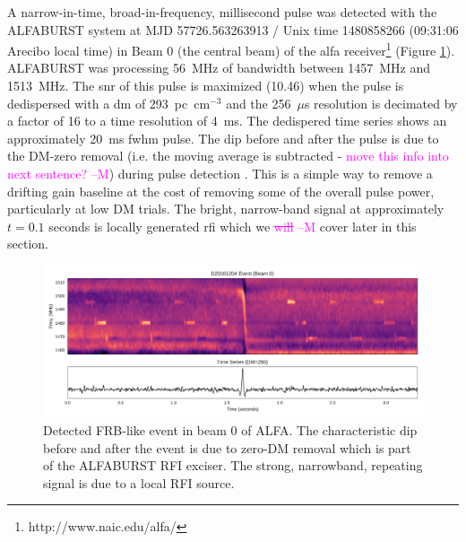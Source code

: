 \documentclass[a4paper,fleqn,usenatbib]{mnras}
\newcommand{\cM}[1]{\textcolor{magenta}{ #1 --M}}
\begin{document}
A narrow-in-time, broad-in-frequency, millisecond pulse was detected with the
ALFABURST system at MJD 57726.563263913 / Unix time 1480858266 (09:31:06
Arecibo local time) in Beam 0 (the central beam) of the \gls{alfa}
receiver\footnote{http://www.naic.edu/alfa/} (Figure
\ref{fig:beam0_dynamic_spec_wide}). ALFABURST was processing 56~MHz of
bandwidth between 1457~MHz and 1513~MHz. The \gls{snr} of this pulse is
maximized (10.46) when the pulse is dedispersed with a \gls{dm} of
293~pc~cm$^{-3}$ and the 256~$\mu$s resolution is decimated by a factor of 16 to
a time resolution of 4~ms. The dedispered time series shows an approximately 20~ms
\gls{fwhm} pulse. The dip before and after the pulse is due to the DM-zero
removal (i.e. the moving average is subtracted - \cM{move this info into next sentence?}) during pulse detection
\citep{2009MNRAS.395..410E}. This is a simple way to remove a drifting gain
baseline at the cost of removing some of the overall pulse power, particularly
at low DM trials. The bright, narrow-band signal at approximately $t=0.1$
seconds is locally generated \gls{rfi} which we \cM{\sout{will}} cover later in this
section.

\begin{figure}
    \includegraphics[width=1.0\linewidth]{figures/D20161204_buf23_Beam0_wide.pdf}
    \caption{Detected FRB-like event in beam 0 of ALFA. The characteristic dip
    before and after the event is due to zero-DM removal which is part of the
    ALFABURST RFI exciser. The strong, narrowband, repeating signal is due to a
    local RFI source.
    }
    \label{fig:beam0_dynamic_spec_wide}
\end{figure}
\end{document}
